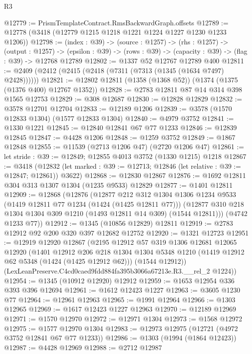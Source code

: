 \begin{lexlean}{R3}
\begin{coremodule}
@12779 := PrismTemplateContract.RmsBackwardGraph.offsets
@12789 := @12778 (@3418 (@12779 @1215 @1218 @1221 @1224 @1227 @1230 @1233 @1206))
@12798 := (index : @39) ->
  (source : @1257) ->
  (rhs : @1257) ->
  (output : @1257) ->
  (epsilon : @39) -> (rows : @39) -> (capacity : @39) -> (flag : @39) -> @12768 @12789
@12802 := @1337 @52 @12767 @12789 @400
@12811 := @2409 (@2412 (@2415 (@2418 (@7311 (@7313 (@1345 (@1634 @7497) @2428))))))
@12821 := @12802 @12811 (@1358 (@1368 @52)) (@1374 (@1375 (@1376 @400) @12767 @1352))
@12828 := @2783 @12811 @87 @14 @314 @398 @1565 @12753
@12829 := @308 @12687
@12830 := @12828 @12829
@12832 := @3578 @12701 @12704
@12833 := @12189 @1206
@12839 := @3578 (@1570 @12833 @1304) (@1577 @12833 @1304)
@12840 := @4979 @3752
@12841 := @1330 @1221
@12845 := @12840 @12841 @67 @77 @1233
@12846 := @12839 @12845
@12847 := @4428 @1206
@12848 := @1259 @3752
@12849 := @1867 @12848
@12855 := @11539 (@2713 @1206 @47) (@2720 @1206 @47)
@12861 := let stride : @39 := @12849; @12855 @4013 @3752 (@1330 @1215) @1218
@12867 := @3418
    (@12832 (let marked : @39 := @12713; @12846 (let relative : @39 := @12847; @12861)) @3622)
@12868 := @12830 @12867
@12876 := @1692 @12811 @304 @313 @1307 @1304 (@1235 @9533) @12829
@12877 := @1401 @12811
@12909 := @12868
    (@12876
      (@12877
        @212
        @312
        @1304
        @1306
        @1234
        @9533
        (@1419 @12811 @77 @1234 (@1424 (@1425 @12811 @77)))
        (@12877 @310 @218 @1304 @1304 @309 @1210 (@1493 @12811 @14 @309) (@1544 @12811)))
      (@4742 @1233 @77))
@12912 := @1345 (@10856 @12829) @12811
@12919 := @2783 @12912 @92 @200 @320 @397 @12682 @12752
@12920 := @1321 @12723
@12951 := @12919
    @12920
    @12867
    (@2195
      @12912
      @57
      @319
      @1306
      @12681
      @12065
      @12920
      (@1401
        @12912
        @206
        @218
        @1304
        @1304
        @5348
        @1210
        (@1419 @12912 @62 @5348 (@1424 (@1425 @12912 @62)))
        (@1544 @12912))
      (LexLeanPreserve.C4cd0caed9fdd884fa395b3066a67213e.R3.__rel_2 @1224))
@12954 := @1345 (@10912 @12920) @12912
@12959 := @1653 @12954 @336 @393 @396 @12694
@12961 := @1612 @12423 @1227
@12963 := @3605 @1230 @77
@12964 := @12961 @12963
@12965 := @1991 @12964
@12966 := @1303 @12965
@12969 := @1617 @12423 @1227 @12963
@12970 := @12189 @12969
@12971 := @1570 @12970
@12972 := @12971 @1304
@12973 := @1568 @12972
@12975 := @1577 @12970 @1304
@12983 := @12973 @12975 (@12721 (@4972 @3752 @12841 @67 @77 @1233))
@12986 := @1303 (@1994 (@1864 @12423))
@12987 := @4428 @12969
@12988 := @2712 @12987

\end{coremodule}
\end{lexlean}
